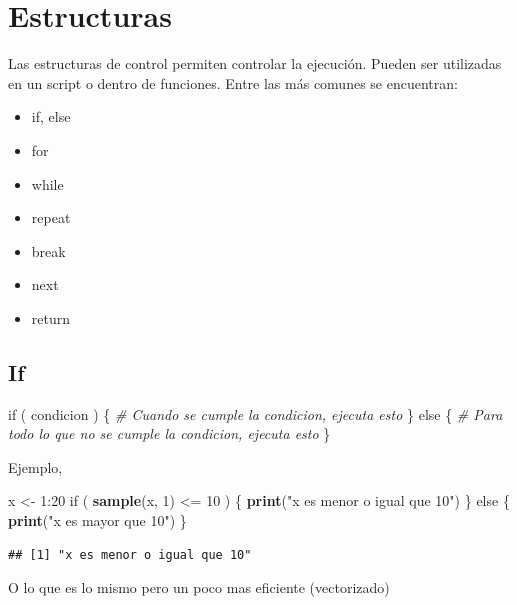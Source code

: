 \documentclass[]{article}
\newenvironment{Shaded}{\begin{snugshade}}{\end{snugshade}}
\newcommand{\KeywordTok}[1]{\textcolor[rgb]{0.13,0.29,0.53}{\textbf{{#1}}}}
\newcommand{\DecValTok}[1]{\textcolor[rgb]{0.00,0.00,0.81}{{#1}}}
\newcommand{\StringTok}[1]{\textcolor[rgb]{0.31,0.60,0.02}{{#1}}}
\newcommand{\CommentTok}[1]{\textcolor[rgb]{0.56,0.35,0.01}{\textit{{#1}}}}
\newcommand{\NormalTok}[1]{{#1}}
\providecommand{\tightlist}{%
  \setlength{\itemsep}{0pt}\setlength{\parskip}{0pt}}
\begin{document}
\section{Estructuras}\label{estructuras}

Las estructuras de control permiten controlar la ejecución. Pueden ser
utilizadas en un script o dentro de funciones. Entre las más comunes se
encuentran:

\begin{itemize}
\tightlist
\item
  if, else
\item
  for
\item
  while
\item
  repeat
\item
  break
\item
  next
\item
  return
\end{itemize}

\subsection{If}\label{if}

\begin{Shaded}
\begin{Highlighting}[]
\NormalTok{if ( condicion ) \{}
  \CommentTok{# Cuando se cumple la condicion, ejecuta esto}
\NormalTok{\} else \{}
  \CommentTok{# Para todo lo que no se cumple la condicion, ejecuta esto}
\NormalTok{\}}
\end{Highlighting}
\end{Shaded}

Ejemplo,

\begin{Shaded}
\begin{Highlighting}[]
\NormalTok{x <-}\StringTok{ }\DecValTok{1}\NormalTok{:}\DecValTok{20}
\NormalTok{if ( }\KeywordTok{sample}\NormalTok{(x, }\DecValTok{1}\NormalTok{) <=}\StringTok{ }\DecValTok{10} \NormalTok{) \{}
  \KeywordTok{print}\NormalTok{(}\StringTok{"x es menor o igual que 10"}\NormalTok{)}
\NormalTok{\} else \{}
  \KeywordTok{print}\NormalTok{(}\StringTok{"x es mayor que 10"}\NormalTok{)}
\NormalTok{\}}
\end{Highlighting}
\end{Shaded}

\begin{verbatim}
## [1] "x es menor o igual que 10"
\end{verbatim}

O lo que es lo mismo pero un poco mas eficiente (vectorizado)
\end{document}
